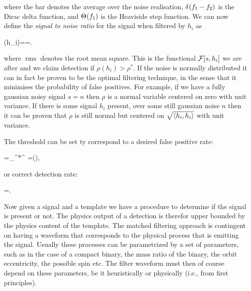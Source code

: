 \documentclass[
  10pt,
  a4paper,
  DIV=11,
  numbers=noendperiod,
  oneside]{scrreprt}
\let\[\relax \let\]\relax %
\DeclareRobustCommand{\[}{\begin{equation}}
\DeclareRobustCommand{\]}{\end{equation}}
\begin{document}
where the bar denotes the average over the noise realisation,
\(\delta^{{}}(f_1-f_2)\) is the Dirac delta function, and \(\Theta^{{}}(f_1)\)
is the Heaviside step function. We can now define the \emph{signal to
noise ratio} for the signal when filtered by \(h_i\) as 

\[
\rho (h_i)==.
\]

where \(\operatorname{rms}\) denotes the root mean square. This is the
functional \(\mathcal{F}[s,h_i ]\) we are after and we claim
detection if \(\rho(h_i)>\rho^*\). If the noise is normally distributed
it can in fact be proven to be the optimal filtering technique, in the
sense that it minimises the probability of false positives. For example,
if we have a fully gaussian noisy signal \(s=n\) then \(\rho\) is a
normal variable centered on zero with unit variance. If there is some
signal \(h_i\) present, over some still gaussian noise \(n\) then it can
be proven that \(\rho\) is still normal but centered on
\(\sqrt{\langle h_i,h_i \rangle}\) with unit variance.

The threshold can be set ty correspond to a desired false positive
rate:

\[=\sqrt{\inv{2\pi}}\int\limits_{\rho^*}^{\infty} \dd{\rho}=\half {}(),\]

or correct detection rate:

\[
=\Half{}.  
\]

Now given a signal and a template we have a procedure to determine if
the signal is present or not. The physics output of a detection is
therefor upper bounded by the physics content of the template. The
matched filtering approach is contingent on having a waveform that
corresponds to the physical process that is emitting the signal. Usually
these processes can be parametrized by a set of parameters, such as in
the case of a compact binary, the mass ratio of the binary, the orbit
eccentricity, the possible spin etc. The filter waveform must then of
course depend on these parameters, be it heuristically or physically
(i.e., from first principles).
\end{document}
